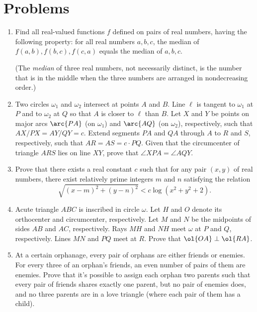 \documentclass[11pt]{scrartcl}
\begin{document}
\section{Problems}
\begin{enumerate}[\bfseries 1.]
\item %
Find all real-valued functions $f$ defined on pairs of real numbers,
having the following property: for all real numbers $a, b, c$,
the median of $f(a,b), f(b,c), f(c,a)$ equals the median of $a, b, c$.

(The \emph{median} of three real numbers, not necessarily distinct,
is the number that is in the middle when the three numbers
are arranged in nondecreasing order.)

\item %
Two circles $\omega_1$ and $\omega_2$ intersect at points $A$ and $B$.
Line $\ell$ is tangent to $\omega_1$ at $P$
and to $\omega_2$ at $Q$ so that $A$ is closer to $\ell$ than $B$.
Let $X$ and $Y$ be points on major arcs $\arc{PA}$
(on $\omega_1$) and $\arc{AQ}$ (on $\omega_2$), respectively,
such that $AX/PX = AY/QY = c$.
Extend segments $PA$ and $QA$ through $A$ to $R$ and $S$,
respectively, such that $AR = AS = c\cdot PQ$.
Given that the circumcenter of triangle $ARS$ lies on line $XY$,
prove that $\angle XPA = \angle AQY$.

\item %
Prove that there exists a real constant $c$
such that for any pair $(x,y)$ of real numbers,
there exist relatively prime integers $m$ and $n$
satisfying the relation
\[ \sqrt{(x-m)^2 + (y-n)^2} < c \log(x^2+y^2+2). \]

\item %
Acute triangle $ABC$ is inscribed in circle $\omega$.
Let $H$ and $O$ denote its orthocenter and circumcenter, respectively.
Let $M$ and $N$ be the midpoints of sides $AB$ and $AC$, respectively.
Rays $MH$ and $NH$ meet $\omega$ at $P$ and $Q$, respectively.
Lines $MN$ and $PQ$ meet at $R$.
Prove that $\ol{OA} \perp \ol{RA}$.

\item %
At a certain orphanage, every pair of orphans are either friends or enemies.
For every three of an orphan's friends,
an even number of pairs of them are enemies.
Prove that it's possible to assign each orphan two parents
such that every pair of friends shares exactly one parent, but no pair of enemies does,
and no three parents are in a love triangle (where each pair of them has a child).


\end{enumerate}
\end{document}
